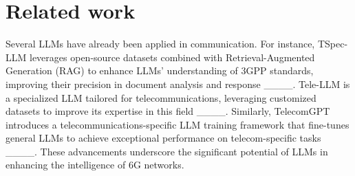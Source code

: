 \section{Related work}
Several LLMs have already been applied in communication. For instance, TSpec-LLM leverages open-source datasets combined with  Retrieval-Augmented Generation (RAG) to enhance LLMs’ understanding of 3GPP standards, improving their precision in document analysis and response ____. Tele-LLM is a specialized LLM tailored for telecommunications, leveraging customized datasets to improve its expertise in this field ____. Similarly, TelecomGPT introduces a telecommunications-specific LLM training framework that fine-tunes general LLMs to achieve exceptional performance on telecom-specific tasks ____. These advancements underscore the significant potential of LLMs in enhancing the intelligence of 6G networks.